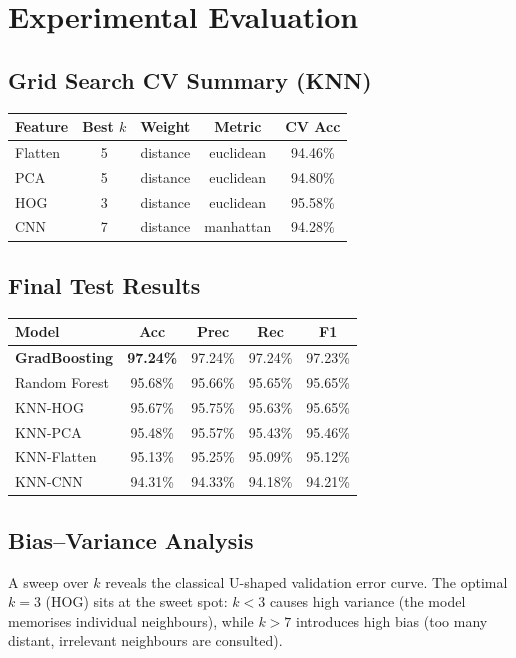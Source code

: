 \documentclass[10pt,twocolumn]{article}
\begin{document}
\section{Experimental Evaluation}

\subsection{Grid Search CV Summary (KNN)}
\begin{center}
\small
\begin{tabular}{lcccc}
\toprule
Feature & Best $k$ & Weight & Metric & CV Acc \\
\midrule
Flatten & 5 & distance & euclidean & 94.46\% \\
PCA     & 5 & distance & euclidean & 94.80\% \\
HOG     & 3 & distance & euclidean & 95.58\% \\
CNN     & 7 & distance & manhattan & 94.28\% \\
\bottomrule
\end{tabular}
\end{center}

\subsection{Final Test Results}
\begin{center}
\small
\begin{tabular}{lcccc}
\toprule
Model & Acc & Prec & Rec & F1 \\
\midrule
\textbf{GradBoosting}  & \textbf{97.24\%} & 97.24\% & 97.24\% & 97.23\% \\
Random Forest          & 95.68\% & 95.66\% & 95.65\% & 95.65\% \\
KNN-HOG                & 95.67\% & 95.75\% & 95.63\% & 95.65\% \\
KNN-PCA                & 95.48\% & 95.57\% & 95.43\% & 95.46\% \\
KNN-Flatten            & 95.13\% & 95.25\% & 95.09\% & 95.12\% \\
KNN-CNN                & 94.31\% & 94.33\% & 94.18\% & 94.21\% \\
\bottomrule
\end{tabular}
\end{center}

\subsection{Bias–Variance Analysis}
A sweep over $k$ reveals the classical U-shaped validation error curve.
The optimal $k=3$ (HOG) sits at the sweet spot: $k<3$ causes high variance
(the model memorises individual neighbours), while $k>7$ introduces high bias
(too many distant, irrelevant neighbours are consulted).
\end{document}
